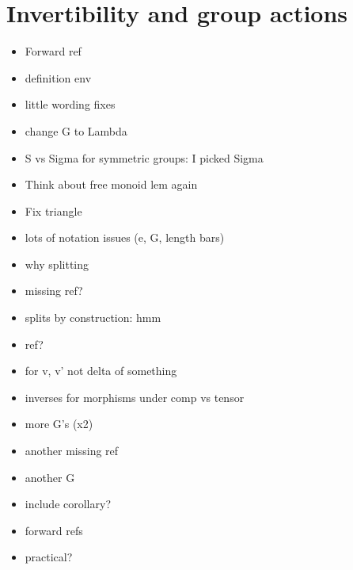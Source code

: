 \documentclass{amsart}
\begin{document}
\section{Invertibility and group actions}
\begin{itemize}
\item Forward ref
\item definition env
\item little wording fixes
\item change G to Lambda
\item S vs Sigma for symmetric groups: I picked Sigma
\item Think about free monoid lem again
\item Fix triangle
\item lots of notation issues (e, G, length bars)
\item why splitting
\item missing ref?
\item splits by construction: hmm
\item ref?
\item for v, v' not delta of something
\item inverses for morphisms under comp vs tensor
\item more G's (x2)
\item another missing ref
\item another G
\item include corollary? 
\item forward refs
\item practical?
\end{itemize}
\end{document}
